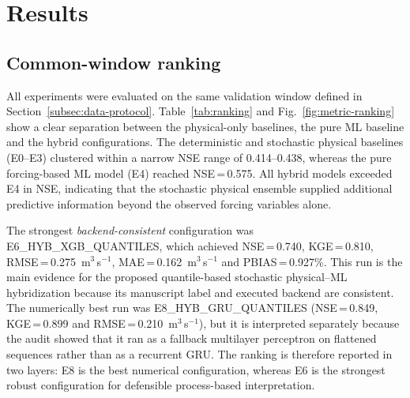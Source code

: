 \section{Results}\label{sec:results}

\subsection{Common-window ranking}\label{subsec:ranking-results}

All experiments were evaluated on the same validation window defined in
Section~\ref{subsec:data-protocol}. Table~\ref{tab:ranking} and
Fig.~\ref{fig:metric-ranking} show a clear separation between the
physical-only baselines, the pure ML baseline and the hybrid
configurations. The deterministic and stochastic physical baselines
(E0--E3) clustered within a narrow NSE range of 0.414--0.438, whereas
the pure forcing-based ML model (E4) reached NSE\,=\,0.575. All hybrid
models exceeded E4 in NSE, indicating that the stochastic physical
ensemble supplied additional predictive information beyond the observed
forcing variables alone.

The strongest \emph{backend-consistent} configuration was
E6\_HYB\_XGB\_QUANTILES, which achieved NSE\,=\,0.740,
KGE\,=\,0.810, RMSE\,=\,0.275~m$^3$\,s$^{-1}$,
MAE\,=\,0.162~m$^3$\,s$^{-1}$ and PBIAS\,=\,0.927\%. This run is the
main evidence for the proposed quantile-based stochastic physical--ML
hybridization because its manuscript label and executed backend are
consistent. The numerically best run was E8\_HYB\_GRU\_QUANTILES
(NSE\,=\,0.849, KGE\,=\,0.899 and RMSE\,=\,0.210~m$^3$\,s$^{-1}$),
but it is interpreted separately because the audit showed that it ran
as a fallback multilayer perceptron on flattened sequences rather than
as a recurrent GRU. The ranking is therefore reported in two layers:
E8 is the best numerical configuration, whereas E6 is the strongest
robust configuration for defensible process-based interpretation.

